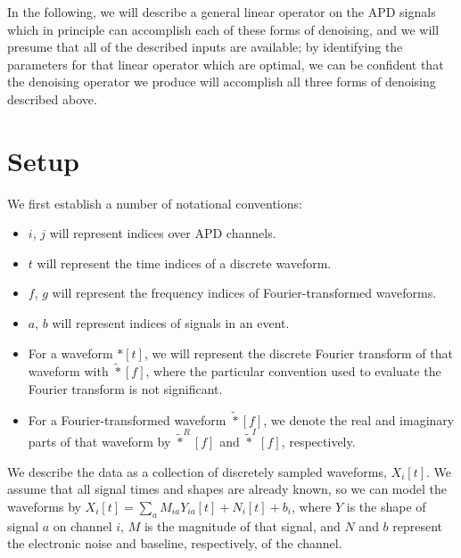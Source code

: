 In the following, we will describe a general linear operator on the APD signals which in principle can accomplish each of these forms of denoising, and we will presume that all of the described inputs are available; by identifying the parameters for that linear operator which are optimal, we can be confident that the denoising operator we produce will accomplish all three forms of denoising described above.

\section{Setup}

We first establish a number of notational conventions:
\begin{itemize}
\item $i$, $j$ will represent indices over APD channels.
\item $t$ will represent the time indices of a discrete waveform.
\item $f$, $g$ will represent the frequency indices of Fourier-transformed waveforms.
\item $a$, $b$ will represent indices of signals in an event.
\item For a waveform $*[t]$, we will represent the discrete Fourier transform of that waveform with $\widetilde{*}[f]$, where the particular convention used to evaluate the Fourier transform is not significant.
\item For a Fourier-transformed waveform $\widetilde{*}[f]$, we denote the real and imaginary parts of that waveform by $\widetilde{*}^R[f]$ and $\widetilde{*}^I[f]$, respectively.
\end{itemize}

We describe the data as a collection of discretely sampled waveforms, $X_i[t]$.  We assume that all signal times and shapes are already known, so we can model the waveforms by $X_i[t] = \sum_a M_{ia}Y_{ia}[t] + N_i[t] + b_i$, where $Y$ is the shape of signal $a$ on channel $i$, $M$ is the magnitude of that signal, and $N$ and $b$ represent the electronic noise and baseline, respectively, of the channel.


